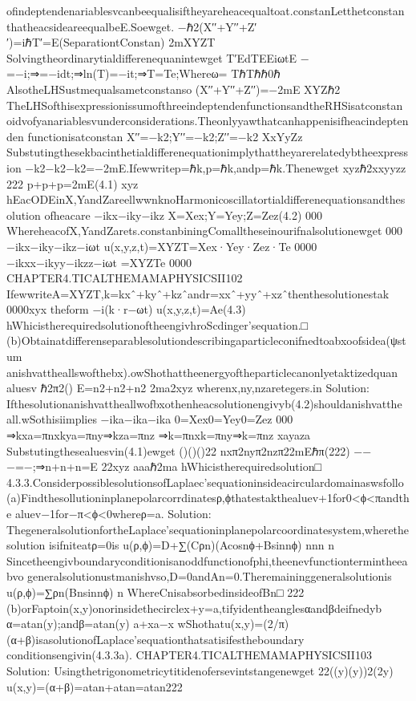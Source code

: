{ofindeptendenariablesvcanbeequalisiftheyareheacequaltoat.constanLetthetconstan
thatheacsideareequalbeE.Soewget.
−ℏ2(X′′+Y′′+Z′′)=iℏT′=E(SeparationtConstan)
2mXYZT
Solvingtheordinarytialdifferenequanintewget
T′EdTEEiωtE
−
=−i;⇒=−idt;⇒ln(T)=−it;⇒T=Te;Whereω=
TℏTℏℏ0ℏ
AlsotheLHSustmequalsametconstanso
(X′′+Y′′+Z′′)=−2mE
XYZℏ2
TheLHSofthisexpressionissumofthreeindeptendenfunctionsandtheRHSisatconstan
oidvofyanariablesvunderconsiderations.Theonlyyawthatcanhappenisifheacindeptenden
functionisatconstan
X′′=−k2;Y′′=−k2;Z′′=−k2
XxYyZz
Substutingthesekbacinthetialdifferenequationimplythattheyarerelatedybtheexpression
−k2−k2−k2=−2mE.Ifewwritep=ℏk,p=ℏk,andp=ℏk.Thenewget
xyzℏ2xxyyzz
222
p+p+p=2mE(4.1)
xyz
hEacODEinX,YandZareellwwnknoHarmonicoscillatortialdifferenequationsandthesolution
ofheacare
−ikx−iky−ikz
X=Xex;Y=Yey;Z=Zez(4.2)
000
WhereheacofX,YandZarets.constanbiningComalltheseinourifnalsolutionewget
000
−ikx−iky−ikz−iωt
u(x,y,z,t)=XYZT=Xex·Yey·Zez·Te
0000
−ikxx−ikyy−ikzz−iωt
=XYZTe
0000
CHAPTER4.TICALTHEMAMAPHYSICSII102
IfewwriteA=XYZT,k=kxˆ+kyˆ+kzˆandr=xxˆ+yyˆ+xzˆthenthesolutionestak
0000xyx
theform
−i(k·r−ωt)
u(x,y,z,t)=Ae(4.3)
hWhicistherequiredsolutionoftheengivhroScdinger’sequation.□
(b)Obtainatdifferenseparablesolutiondescribingaparticleconifnedtoabxoofsidea(ψstum
anishvattheallswofthebx).owShothattheenergyoftheparticlecanonlyetaktizedquan
aluesv
ℏ2π2()
E=n2+n2+n2
2ma2xyz
wherenx,ny,nzaretegers.in
Solution:
Ifthesolutionanishvattheallwofbxothenheacsolutionengivyb(4.2)shouldanishvatthe
all.wSothisiimplies
−ika−ika−ika
0=Xex0=Yey0=Zez
000
⇒kxa=πnxkya=πny⇒kza=πnz
⇒k=πnxk=πny⇒k=πnz
xayaza
Substutingthesealuesvin(4.1)ewget
()()()22
nxπ2nyπ2nzπ22mEℏπ(222)
−−−=−;⇒n+n+n=E
22xyz
aaaℏ2ma
hWhicistherequiredsolution□
4.3.3.ConsiderpossiblesolutionsofLaplaec’sequationinsideacirculardomainaswsfollo
(a)Findthesollutioninplanepolarcorrdinatesρ,ϕthatestakthealuev+1for0<ϕ<πandthe
aluev−1for−π<ϕ<0whereρ=a.
Solution:
ThegeneralsolutionfortheLaplace’sequationinplanepolarcoordinatesystem,wherethesolution
isifniteatρ=0is
u(ρ,ϕ)=D+∑(Cρn)(Acosnϕ+Bsinnϕ)
nnn
n
Sincetheengivboundaryconditionisanoddfunctionofphi,theenevfunctiontermintheeabvo
generalsolutionustmanishvso,D=0andAn=0.Theremaininggeneralsolutionis
u(ρ,ϕ)=∑ρn(Bnsinnϕ)
n
WhereCnisabsorbedinsideofBn□
222
(b)orFaptoin(x,y)onorinsidethecirclex+y=a,tifyidentheanglesαandβdeifnedyb
α=atan(y);andβ=atan(y)
a+xa−x
wShothatu(x,y)=(2/π)(α+β)isasolutionofLaplace’sequationthatsatisifestheboundary
conditionsengivin(4.3.3a).
CHAPTER4.TICALTHEMAMAPHYSICSII103
Solution:
Usingthetrigonometricytitidenofersevintstangenewget
22((y)(y))2(2y)
u(x,y)=(α+β)=atan+atan=atan222
}
